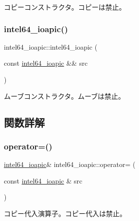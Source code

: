 コピーコンストラクタ。コピーは禁止。 \hypertarget{classintel64__ioapic_a69d45f8e24865e3460f55876a09018f1}{}\label{classintel64__ioapic_a69d45f8e24865e3460f55876a09018f1} 
\subsubsection{\texorpdfstring{intel64\+\_\+ioapic()}{intel64\_ioapic()}\hspace{0.1cm}{\footnotesize\ttfamily [3/3]}}
{\footnotesize\ttfamily intel64\+\_\+ioapic\+::intel64\+\_\+ioapic (\begin{DoxyParamCaption}\item[{const \hyperlink{classintel64__ioapic}{intel64\+\_\+ioapic} \&\&}]{src }\end{DoxyParamCaption})\hspace{0.3cm}{\ttfamily [delete]}}

ムーブコンストラクタ。ムーブは禁止。 

\subsection{関数詳解}
\hypertarget{classintel64__ioapic_a503e60731936974a4260a78a5a6766a1}{}\label{classintel64__ioapic_a503e60731936974a4260a78a5a6766a1} 
\subsubsection{\texorpdfstring{operator=()}{operator=()}\hspace{0.1cm}{\footnotesize\ttfamily [1/2]}}
{\footnotesize\ttfamily \hyperlink{classintel64__ioapic}{intel64\+\_\+ioapic}\& intel64\+\_\+ioapic\+::operator= (\begin{DoxyParamCaption}\item[{const \hyperlink{classintel64__ioapic}{intel64\+\_\+ioapic} \&}]{src }\end{DoxyParamCaption})\hspace{0.3cm}{\ttfamily [delete]}}

コピー代入演算子。コピー代入は禁止。 \hypertarget{classintel64__ioapic_a3e11addf56fa011cefc5aa504b18585c}{}\label{classintel64__ioapic_a3e11addf56fa011cefc5aa504b18585c} 
